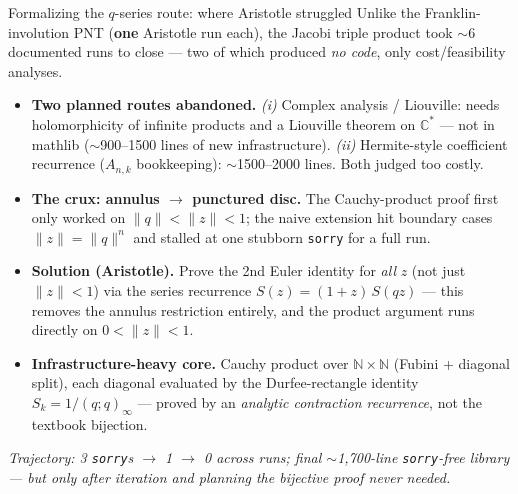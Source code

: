 \documentclass[10pt]{beamer}
\begin{document}
\begin{frame}{Formalizing the $q$-series route: where Aristotle struggled}
\footnotesize
Unlike the Franklin-involution PNT (\textbf{one} Aristotle run each), the Jacobi
triple product took \alert{$\sim$6 documented runs} to close --- two of which produced
\emph{no code}, only cost/feasibility analyses.
\medskip

\begin{itemize}
\item \textbf{Two planned routes abandoned.}
  \emph{(i)} Complex analysis / Liouville: needs holomorphicity of infinite products and a
  Liouville theorem on $\mathbb C^\ast$ --- \alert{not in mathlib} ($\sim$900--1500 lines of new
  infrastructure). \emph{(ii)} Hermite-style coefficient recurrence ($A_{n,k}$ bookkeeping):
  $\sim$1500--2000 lines. Both judged too costly.
\item \textbf{The crux: annulus $\to$ punctured disc.} The Cauchy-product proof first only
  worked on $\|q\|<\|z\|<1$; the naive extension hit \alert{boundary cases $\|z\|=\|q\|^n$} and
  stalled at one stubborn \texttt{sorry} for a full run.
\item \textbf{Solution (Aristotle).} Prove the 2nd Euler identity for \emph{all} $z$ (not just
  $\|z\|<1$) via the series recurrence $S(z)=(1+z)\,S(qz)$ --- this \alert{removes the annulus
  restriction entirely}, and the product argument runs directly on $0<\|z\|<1$.
\item \textbf{Infrastructure-heavy core.} Cauchy product over $\mathbb N\times\mathbb N$
  (Fubini + diagonal split), each diagonal evaluated by the Durfee-rectangle identity
  $S_k=1/(q;q)_\infty$ --- proved by an \emph{analytic contraction recurrence}, not the
  textbook bijection.
\end{itemize}
\smallskip
\centering\footnotesize\emph{Trajectory: 3 \texttt{sorry}s $\to$ 1 $\to$ 0 across runs;
final $\sim$1{,}700-line \texttt{sorry}-free library --- but only after iteration and planning
the bijective proof never needed.}
\end{frame}
\end{document}
